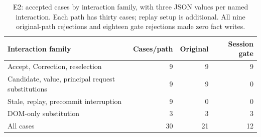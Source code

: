 \begin{table}[tb]
\centering
\small
\caption{E2: accepted cases by interaction family, with three JSON values per named interaction. Each path has thirty cases; replay setup is additional. All nine original-path rejections and eighteen gate rejections made zero fact writes.}
\label{tab:dke-review}
\begin{tabularx}{\linewidth}{@{}Xrrr@{}}
\toprule
Interaction family & Cases/path & Original & Session gate \\
\midrule
Accept, Correction, reselection & 9 & 9 & 9 \\
Candidate, value, principal request substitutions & 9 & 9 & 0 \\
Stale, replay, precommit interruption & 9 & 0 & 0 \\
DOM-only substitution & 3 & 3 & 3 \\
\midrule
All cases & 30 & 21 & 12 \\
\bottomrule
\end{tabularx}
\end{table}
